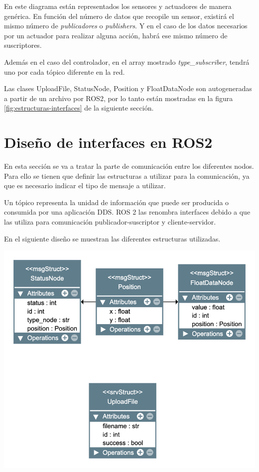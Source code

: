 En este diagrama están representados los sensores y actuadores de manera genérica. En función del número de datos que recopile un sensor, existirá el mismo número de \textit{publicadores} o \textit{publishers}. Y en el caso de los datos necesarios por un actuador para realizar alguna acción, habrá ese mismo número de suscriptores.

Además en el caso del controlador, en el array mostrado \textit{type\_subscriber}, tendrá uno por cada tópico diferente en la red.

Las clases UploadFile, StatusNode, Position y FloatDataNode son autogeneradas a partir de un archivo por ROS2, por lo tanto están mostradas en la figura \ref{fig:estructuras-interfaces} de la siguiente sección.

\section{Diseño de interfaces en ROS2}

En esta sección se va a tratar la parte de comunicación entre los diferentes nodos. Para ello se tienen que definir las estructuras a utilizar para la comunicación, ya que es necesario indicar el tipo de mensaje a utilizar.

Un tópico \cite{topic} representa la unidad de información que puede ser producida o consumida por una aplicación DDS. ROS 2 las renombra interfaces debido a que las utiliza para comunicación publicador-suscriptor y cliente-servidor.

En el siguiente diseño se muestran las diferentes estructuras utilizadas.

\begin{center}
    \centering
    \includegraphics[width=\textwidth]{img/05-Interfaces.png}
    \label{fig:estructuras-interfaces}
\end{center}

